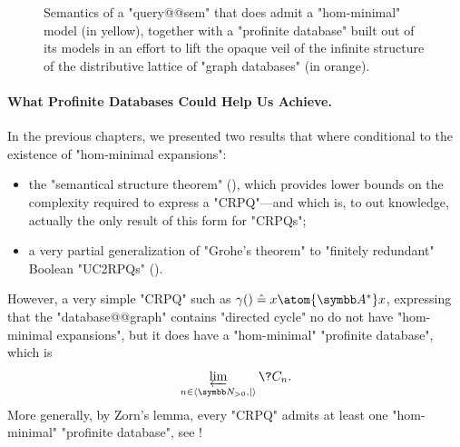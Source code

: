 \begin{figure}
	\centering
	\caption{\AP\label{fig:poset-reldb-profinite}
	Semantics of a "query@@sem" that does admit a "hom-minimal" model
	(in yellow),
	together with a "profinite database" built out of its models
	in an effort to lift the opaque veil of the infinite structure of the distributive lattice
	of "graph databases" (in orange).
	}
\end{figure}

\paragraph{What Profinite Databases Could Help Us Achieve.}
In the previous chapters, we presented two results that where conditional
to the existence of "hom-minimal expansions":
\begin{itemize}
	\item the "semantical structure theorem" (), which
		provides lower bounds on the complexity required to express a "CRPQ"---and which is,
		to out knowledge, actually the only result of this form for "CRPQs";
	\item a very partial generalization of "Grohe's theorem" to
		"finitely redundant" Boolean "UC2RPQs" ().
\end{itemize}
However, a very simple "CRPQ" such as $\gamma() \defeq x \atom{\A^*} x$,
expressing that the "database@@graph" contains "directed cycle" no do not
have "hom-minimal expansions", but it does have a "hom-minimal" 
"profinite database", which is \[\varprojlim\limits_{n\in\tup{\Np,\mid}} \?C_{n}.\]
More generally, by Zorn's lemma, every "CRPQ" admits at least 
one "hom-minimal" "profinite database", see !

